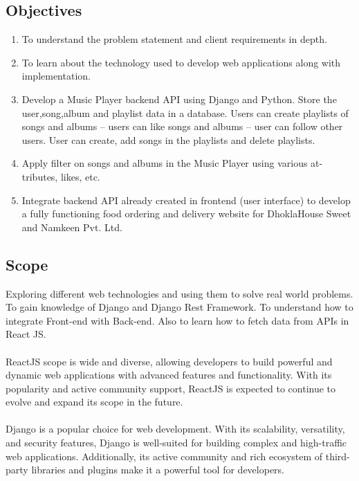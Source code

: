 \documentclass[a4paper, 12pt]{article}
\begin{document}
\subsection{Objectives}
\begin{enumerate}
    \item To understand the problem statement and client requirements in depth.
    \item To learn about the technology used to develop web applications along with implementation.
    \item Develop a Music Player backend API using Django and Python. Store the user,song,album and playlist data in a database. Users can create playlists of songs and albums – users can like songs and albums – user can follow other users. User can create, add songs in the playlists and delete playlists.
    \item Apply filter on songs and albums in the Music Player using various at-
tributes, likes, etc.
    \item Integrate backend API already created in
frontend (user interface) to develop a fully functioning food ordering and delivery
website for DhoklaHouse Sweet and Namkeen Pvt. Ltd.
\end{enumerate}
\subsection{Scope}
\hspace{10mm}Exploring different web technologies and using them to solve
real world problems. To gain knowledge of Django and Django Rest Framework. To
understand how to integrate Front-end with Back-end. Also to learn
how to fetch data from APIs in React JS.\\\\
\hspace*{10mm}ReactJS scope is wide and diverse, allowing developers to build powerful and dynamic web applications with advanced features and functionality. With its popularity and active community support, ReactJS is expected to continue to evolve and expand its scope in the future. \\\\
\hspace*{10mm} Django is a popular choice for web development. With its scalability, versatility, and security features, Django is well-suited for building complex and high-traffic web applications. Additionally, its active community and rich ecosystem of third-party libraries and plugins make it a powerful tool for developers.
\newpage
\end{document}

